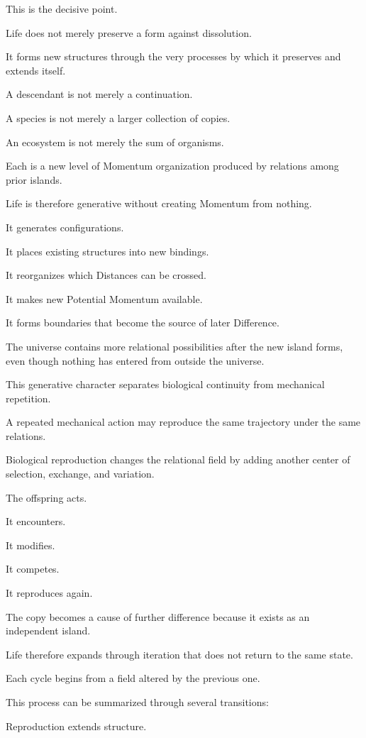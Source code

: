 This is the decisive point.

Life does not merely preserve a form against dissolution.

It forms new structures through the very processes by which it preserves and extends itself.

A descendant is not merely a continuation.

A species is not merely a larger collection of copies.

An ecosystem is not merely the sum of organisms.

Each is a new level of Momentum organization produced by relations among prior islands.

Life is therefore generative without creating Momentum from nothing.

It generates configurations.

It places existing structures into new bindings.

It reorganizes which Distances can be crossed.

It makes new Potential Momentum available.

It forms boundaries that become the source of later Difference.

The universe contains more relational possibilities after the new island forms, even though nothing has entered from outside the universe.

This generative character separates biological continuity from mechanical repetition.

A repeated mechanical action may reproduce the same trajectory under the same relations.

Biological reproduction changes the relational field by adding another center of selection, exchange, and variation.

The offspring acts.

It encounters.

It modifies.

It competes.

It reproduces again.

The copy becomes a cause of further difference because it exists as an independent island.

Life therefore expands through iteration that does not return to the same state.

Each cycle begins from a field altered by the previous one.

This process can be summarized through several transitions:

Reproduction extends structure.

